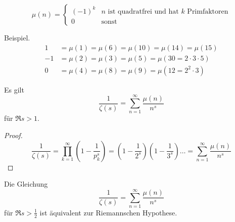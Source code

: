 \begin{frame}

    \begin{definition}
        \[
            \mu(n) = \begin{cases}
                (-1)^k & n \text{ ist quadratfrei und hat $k$ Primfaktoren}\\
                0 & \text{sonst}
            \end{cases}  
        \]
    \end{definition}
    \begin{block}{Beispiel.}
        \begin{align*}
            1 &= \mu(1) = \mu(6) = \mu(10) = \mu(14) = \mu(15)\\ 
            -1 &= \mu(2) = \mu(3) = \mu(5) = \mu(30 = 2 \cdot 3 \cdot 5)\\
            0 &= \mu(4) = \mu(8) = \mu(9) = \mu(12 = 2^2 \cdot 3)
        \end{align*}
    \end{block}
\end{frame}
\begin{frame}
    \begin{lemma}
        Es gilt \[
            \frac{1}{\zeta(s)} = \sum_{n = 1}^{\infty} \frac{\mu(n)}{n^s}  
            \] 
        für $\Re s > 1$.
    \end{lemma}
    \begin{proof}
        \[
            \frac{1}{\zeta(s)} = \prod_{k=1}^\infty \left(1 - \frac{1}{p_k^s}\right) = \left(1 - \frac{1}{2^s}\right)\left(1 - \frac{1}{3^s}\right) \dots = \sum_{n = 1}^{\infty} \frac{\mu(n)}{n^s} 
        \]
    \end{proof}
\end{frame}
\begin{frame}
    \begin{theorem}
        Die Gleichung \[
            \frac{1}{\zeta(s)} = \sum_{n = 1}^{\infty} \frac{\mu(n)}{n^s}
        \] für $\Re s > \frac{1}{2}$ ist äquivalent zur Riemannschen Hypothese.
    \end{theorem}
\end{frame}